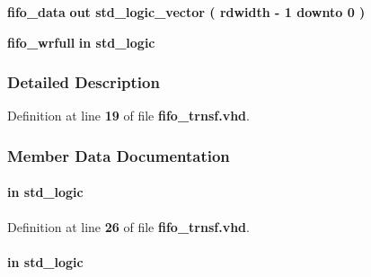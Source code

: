 \begin{DoxyCompactItemize}
{\bf fifo\+\_\+data}  {\bfseries {\bfseries \textcolor{keywordflow}{out}\textcolor{vhdlchar}{ }}} {\bfseries \textcolor{comment}{std\+\_\+logic\+\_\+vector}\textcolor{vhdlchar}{ }\textcolor{vhdlchar}{(}\textcolor{vhdlchar}{ }\textcolor{vhdlchar}{ }\textcolor{vhdlchar}{ }\textcolor{vhdlchar}{ }{\bfseries {\bf rdwidth}} \textcolor{vhdlchar}{-\/}\textcolor{vhdlchar}{ } \textcolor{vhdldigit}{1} \textcolor{vhdlchar}{ }\textcolor{keywordflow}{downto}\textcolor{vhdlchar}{ }\textcolor{vhdlchar}{ } \textcolor{vhdldigit}{0} \textcolor{vhdlchar}{ }\textcolor{vhdlchar}{)}\textcolor{vhdlchar}{ }} 
\item 
{\bf fifo\+\_\+wrfull}  {\bfseries {\bfseries \textcolor{keywordflow}{in}\textcolor{vhdlchar}{ }}} {\bfseries \textcolor{comment}{std\+\_\+logic}\textcolor{vhdlchar}{ }} 
\end{DoxyCompactItemize}


\subsubsection{Detailed Description}


Definition at line {\bf 19} of file {\bf fifo\+\_\+trnsf.\+vhd}.



\subsubsection{Member Data Documentation}
\paragraph[{areset\+\_\+n}]{ {\bfseries \textcolor{keywordflow}{in}\textcolor{vhdlchar}{ }} {\bfseries \textcolor{comment}{std\+\_\+logic}\textcolor{vhdlchar}{ }} \hspace{0.3cm}{\ttfamily [Port]}}\label{classfifo__trnsf_a8314c18b01ca27d82c96804df4a15c27}


Definition at line {\bf 26} of file {\bf fifo\+\_\+trnsf.\+vhd}.

\paragraph[{clk}]{ {\bfseries \textcolor{keywordflow}{in}\textcolor{vhdlchar}{ }} {\bfseries \textcolor{comment}{std\+\_\+logic}\textcolor{vhdlchar}{ }} \hspace{0.3cm}{\ttfamily [Port]}}\label{classfifo__trnsf_a4a4609c199d30b3adebbeb3a01276ec5}


